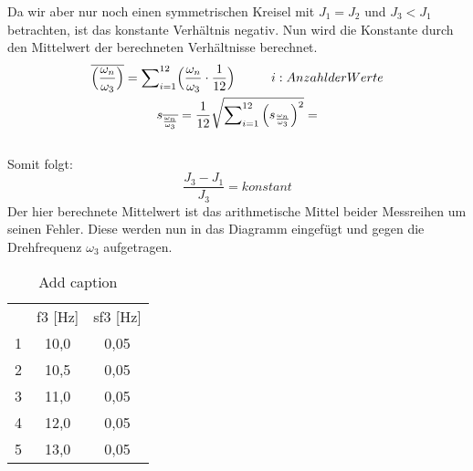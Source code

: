 Da wir aber nur noch einen symmetrischen Kreisel mit $J_1 = J_2$ und $J_3<J_1$ betrachten, ist das konstante Verh\"altnis  negativ. Nun wird die Konstante durch den Mittelwert der berechneten Verh\"altnisse berechnet.
\begin{gather}   
    \overline{\Bigl(\frac{\omega_n}{\omega_3}\Bigr)} = \sum\nolimits_{i=1}^{12}\Bigl(\frac{\omega_n}{\omega_3}\cdot{\frac{1}{12}}\Bigr) \tab i: Anzahl der Werte\\
    s_{\overline{\frac{\omega_n}{\omega_3}} }= \frac{1}{12}\sqrt{\sum\nolimits_{i=1}^{12}{\Bigl(s_{\frac{\omega_n}{\omega_3}}\Bigr)}^2}=
\end{gather} \\
Somit folgt: 
\begin{equation}
    \frac{J_3-J_1}{J_3}= konstant
\end{equation}
Der hier berechnete Mittelwert ist das arithmetische Mittel beider Messreihen um seinen Fehler. Diese werden nun in das Diagramm eingef\"ugt und gegen die Drehfrequenz $\omega_3$ aufgetragen. 

\begin{table}[htbp]
    \caption{Add caption}
      \begin{tabular}{ccc}
            & \cellcolor[rgb]{ .741,  .843,  .933} f3 [Hz] & \cellcolor[rgb]{ .741,  .843,  .933} sf3 [Hz] \\
      1     & 10,0  & 0,05 \\
      2     & 10,5  & 0,05 \\
      3     & 11,0  & 0,05 \\
      4     & 12,0  & 0,05 \\
      5     & 13,0  & 0,05 \\
      \end{tabular}%
    \label{tab:addlabel}%
  \end{table}%
  